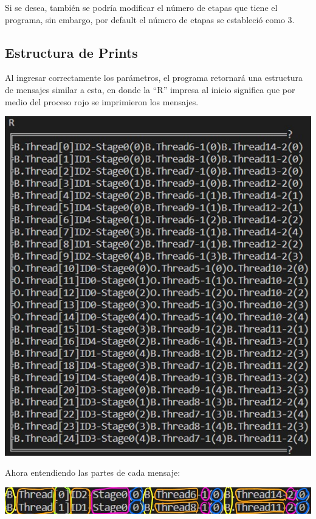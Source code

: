 \documentclass[a4paper]{article}
\begin{document}
    Si se desea, también se podría modificar el número de etapas que tiene el programa, sin embargo, por default el número de etapas se estableció como 3. 

    \subsection{Estructura de Prints}
    Al ingresar correctamente los par\'ametros, el programa retornar\'a una estructura de mensajes similar a esta, en donde la ``R'' impresa al inicio significa que por medio del proceso rojo se imprimieron los mensajes.\\
    \begin{center}
        \includegraphics[scale=0.5]{P1.jpeg}    
    \end{center}
    Ahora entendiendo las partes de cada mensaje:
    \begin{center}
        \includegraphics[scale=0.5]{P2.jpeg}    
    \end{center}
\end{document}
